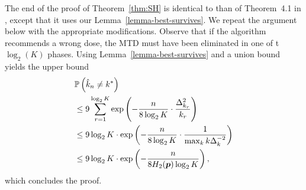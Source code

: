 %
%
The end of the proof of Theorem~\ref{thm:SH} is identical to than of Theorem~4.1 in \cite{Karnin13}, except that it uses our Lemma~\ref{lemma-best-survives}. We repeat the argument below with the appropriate modifications. 
Observe that if the algorithm recommends a wrong dose, the MTD must have been eliminated in one of t $\log_2(K)$ phases. Using Lemma~\ref{lemma-best-survives} and a union bound yields the upper bound
\begin{align*}
&\mathbb{P}\left(\hat{k}_n \neq k^*\right)
\\ &\leq 9 \sum_{r=1}^{\log_2 K} \exp \left(
	- \frac{n}{8 \log_2 K} \cdot \frac{\Delta^2_{k_r}}{k_r}
	\right)	
\\
	&\le 9 \log_2 K \cdot \exp \left(
		- \frac{n}{8 \log_2 K} \cdot \frac{1}{\max_k k \Delta^{-2}_k}
	\right)
\\
	&\le 9 \log_2 K \cdot \exp \left(
		- \frac{n}{8 H_2(\bm p) \log_2 K}
	\right),
\end{align*}
which concludes the proof.

